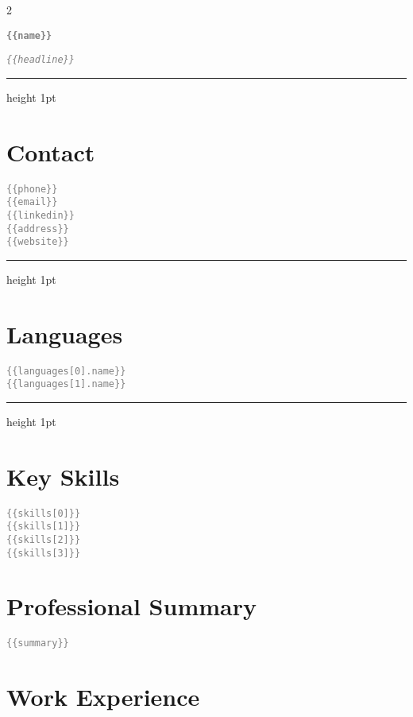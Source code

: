\documentclass[10pt,letterpaper]{article}
\newcommand{\tpl}[1]{\textcolor{Gray}{\texttt{\{\{#1\}\}}}}
\newcommand{\cvName}[1]{\vspace*{0.3in}\textbf{\LARGE #1}}
\newcommand{\cvHeadline}[1]{\par\smallskip\textit{#1}}
\newcommand{\cvHr}{\vspace{0.5\baselineskip}\hrule height 1pt\color{primary}\vspace{0.7\baselineskip}}
\begin{document}
\small
\begin{paracol}{2}

\begin{leftcolumn}
\begin{center}
\end{center}

\vspace{0.6in}

\cvName{\tpl{name}}
\cvHeadline{\tpl{headline}}
\cvHr

\section*{Contact}
\tpl{phone}\\
\tpl{email}\\
\tpl{linkedin}\\
\tpl{address}\\
\tpl{website}

\cvHr
\section*{Languages}
\tpl{languages[0].name}\\
\tpl{languages[1].name}

\cvHr
\section*{Key Skills}
\tpl{skills[0]}\\
\tpl{skills[1]}\\
\tpl{skills[2]}\\
\tpl{skills[3]}
\end{leftcolumn}

\begin{rightcolumn}
\section*{Professional Summary}
\tpl{summary}

\vspace{1in}
\section*{Work Experience}


\end{rightcolumn}
\end{paracol}
\end{document}
